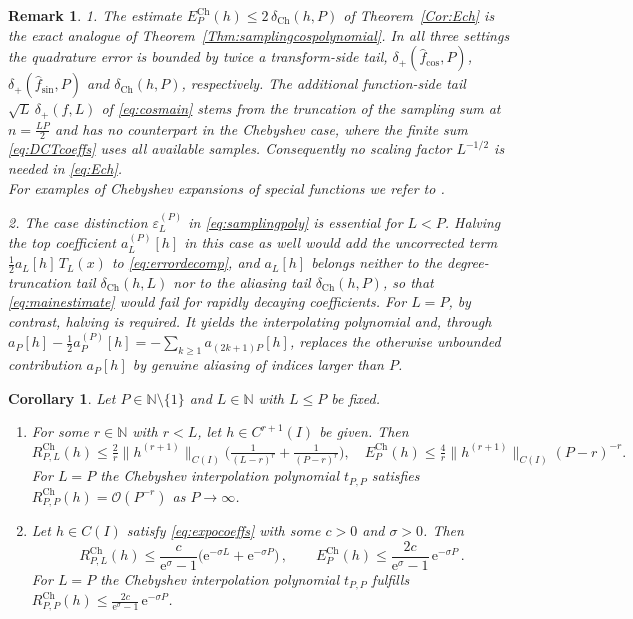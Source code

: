 \documentclass[11pt,a4paper]{scrartcl}
\newtheorem{remark}[theorem]{Remark}
\newtheorem{corollary}[theorem]{Corollary}
\numberwithin{equation}{section}
\numberwithin{table}{section}
\numberwithin{figure}{section}
\newcommand{\e}{\mathrm e}
\newcommand{\N}{\mathbb N}
\newcommand{\fcos}{{\hat f}_{\cos}}
\newcommand{\fsin}{{\hat f}_{\sin}}
\newcommand{\dpl}{\delta_{+}}
\newcommand{\dch}{\delta_{\mathrm{Ch}}}
\newcommand{\Ech}{E^{\mathrm{Ch}}}
\newcommand{\Rch}{R^{\mathrm{Ch}}}
\begin{document}
\begin{remark}
\label{Rem:comparison}
1. The estimate $\Ech_{P}(h) \le 2\,\dch(h,P)$ of Theorem~\ref{Cor:Ech}
 is the exact analogue of
Theorem~\ref{Thm:samplingcospolynomial}. In all three settings the quadrature  error
is bounded by twice a transform-side tail, $\dpl(\fcos,P)$, $\dpl(\fsin,P)$ and
$\dch(h,P)$, respectively. The additional function-side tail $\sqrt
L\,\dpl(f,L)$ of \eqref{eq:cosmain} stems from the truncation of the sampling sum
at $n = \frac{LP}{2}$ and has no counterpart in the Chebyshev case, where the finite sum
\eqref{eq:DCTcoeffs} uses all available samples. Consequently no scaling factor
$L^{-1/2}$ is needed in \eqref{eq:Ech}.\\
For examples of Chebyshev expansions of special functions we refer to \textnormal{\cite[Table~A.2]{PlPoStTa23}}.

2. The case distinction $\varepsilon_L^{(P)}$ in \eqref{eq:samplingpoly} is essential for $L<P$.
Halving the top coefficient $a_L^{(P)}[h]$ in this case as well would add the uncorrected term
$\tfrac12 a_L[h]\,T_L(x)$ to \eqref{eq:errordecomp}, and $a_L[h]$ belongs neither to the
degree-truncation tail $\dch(h,L)$ nor to the aliasing tail $\dch(h,P)$, so that
\eqref{eq:mainestimate} would fail for rapidly decaying coefficients. For $L=P$, by contrast,
halving is required. It yields the interpolating polynomial and, through
$a_P[h]-\tfrac12 a_P^{(P)}[h]=-\sum_{k\ge1} a_{(2k+1)P}[h]$, replaces the otherwise unbounded
contribution $a_P[h]$ by genuine aliasing of indices larger than  $P$.
\end{remark}

\begin{corollary}
	\label{Thm:Cpolydecay}
	Let $P\in \N\setminus \{1\}$ and $L\in \N$ with $L \leq P$ be fixed.
	\begin{enumerate}
	\item For some
	$r\in\N$ with $r < L$, let $h\in C^{r+1}(I)$ be given. Then
	\begin{equation}
		\label{eq:polydecayerror}
		\textstyle \Rch_{P,L}(h) \leq \tfrac{2}{r}\|h^{(r+1)}\|_{C(I)}
		\big(\tfrac{1}{(L-r)^r} + \tfrac{1}{(P-r)^r}\big),
		\quad
		\Ech_{P}(h) \leq \tfrac{4}{r}\|h^{(r+1)}\|_{C(I)}(P-r)^{-r}.
	\end{equation}
	For $L=P$ the Chebyshev interpolation polynomial $t_{P,P}$ satisfies
	$\Rch_{P,P}(h) = {\mathcal O}(P^{-r})$ as $P \to \infty$.
	\item
Let
	$h \in C(I)$ satisfy \eqref{eq:expocoeffs} with some $c>0$ and $\sigma>0$. Then
\begin{equation}
		\label{eq:expodecayerror}
	\textstyle 	\Rch_{P,L}(h) \leq \frac{c}{\e^{\sigma}-1}
		\bigl(\e^{-\sigma L}+\e^{-\sigma P}\bigr)\,, \qquad
		\Ech_{P}(h) \leq \frac{2c}{\e^{\sigma}-1}\,\e^{-\sigma P}\,.
	\end{equation}
	For $L = P$ the Chebyshev interpolation polynomial $t_{P,P}$ fulfills
	$\Rch_{P,P}(h)\leq\frac{2c}{\e^{\sigma}-1}\,\e^{-\sigma P}$.	
	\end{enumerate}	
\end{corollary}
\end{document}
